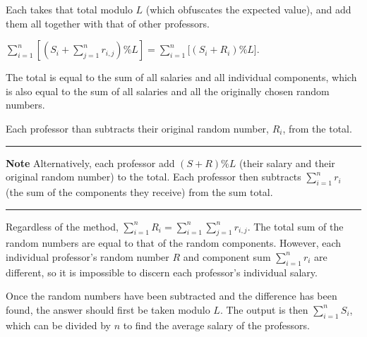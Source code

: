 \documentclass[12pt]{article}
\begin{document}
\begin{enumerate}[(a)]
Each takes that total modulo $L$ (which obfuscates the expected value), and add them all together with that of other professors.\newline

$\sum_{i=1}^{n} [(S_i + \sum_{j=1}^{n} r_{i,j})\%L] = \sum_{i=1}^{n} [(S_i + R_i)\%L$].\newline

The total is equal to the sum of all salaries and all individual components, which is also equal to the sum of all salaries and all the originally chosen random numbers.\newline

Each professor than subtracts their original random number, $R_i$, from the total.\newline

\noindent\rule{10cm}{0.4pt}\newline

\textbf{Note} Alternatively, each professor add $(S + R)\%L$ (their salary and their original random number) to the total. Each professor then subtracts $\sum_{i=1}^{n} r_i$ (the sum of the components they receive) from the sum total.\newline

\noindent\rule{10cm}{0.4pt}\newline

Regardless of the method, $\sum_{i=1}^n R_i = \sum_{i=1}^n \sum_{j=1}^n r_{i,j}$. The total sum of the random numbers are equal to that of the random components. However, each individual professor's random number $R$ and component sum $\sum_{i=1}^n r_i$ are different, so it is impossible to discern each professor's individual salary.\newline

Once the random numbers have been subtracted and the difference has been found, the answer should first be taken modulo $L$. The output is then $\sum_{i=1}^n S_i$, which can be divided by $n$ to find the average salary of the professors.
\end{enumerate}
\end{document}
